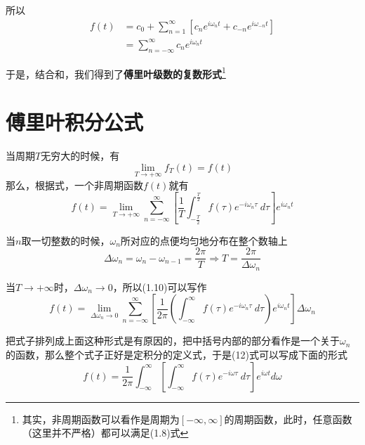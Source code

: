         所以
        \begin{equation}
            \begin{split}
                f(t)&= c_0+\sum\limits_{n=1}^\infty[c_n e^{i\omega_n t}+c_{-n}e^{i\omega_{-n} t}]\\
                &= \sum\limits_{n=-\infty}^{\infty}c_n e^{i\omega_n t}
            \end{split}
            \label{eq: 1.8}
        \end{equation}

        于是，结合和，我们得到了\textbf{傅里叶级数的复数形式}\footnote{其实，非周期函数可以看作是周期为$[-\infty, \infty]$的周期函数，此时，任意函数（这里并不严格）都可以满足(1.8)式}

    \section{傅里叶积分公式}
        当周期$T$无穷大的时候，有
        \begin{equation}
            \lim_{T\to +\infty}f_T(t)=f(t)
            \label{eq: 1.9}
        \end{equation}
        那么，根据式，一个非周期函数$f(t)$就有
        \begin{equation}
            f(t)=\lim_{T\to +\infty}\sum\limits_{n=-\infty}^{\infty}\left[\dfrac{1}{T}\int_{-\frac{T}{2}}^{\frac{T}{2}}f(\tau)e^{-i\omega_n \tau}\ d\tau\right] e^{i\omega_n t}
            \label{eq: 1.10}
        \end{equation}

        当$n$取一切整数的时候，$\omega_n$所对应的点便均匀地分布在整个数轴上
        \begin{equation}
            \Delta\omega_n=\omega_n-\omega_{n - 1}=\dfrac{2\pi}{T}\Rightarrow T=\dfrac{2\pi}{\Delta\omega_n}
            \label{eq: 1.11}
        \end{equation}
        
        当$T\to +\infty$时，$\Delta\omega_n\to 0$，所以(1.10)可以写作
        \begin{equation}
            f(t)=\lim_{\Delta\omega_n\to 0}\sum\limits_{n=-\infty}^{\infty}\left[\dfrac{1}{2\pi}\left(\int_{-\infty}^{\infty}f(\tau)e^{-i\omega_n \tau}\ d\tau\right)e^{i\omega_n t}\right] \Delta\omega_n
            \label{eq: 1.12}
        \end{equation}
        
        把式子排列成上面这种形式是有原因的，把中括号内部的部分看作是一个关于$\omega_n$的函数，那么整个式子正好是定积分的定义式，于是(12)式可以写成下面的形式
        \begin{equation}
            f(t)=\dfrac{1}{2\pi}\int_{-\infty}^{\infty}\left[\int_{-\infty}^{\infty}f(\tau)e^{-i\omega \tau}\ d\tau\right] e^{i\omega t} d\omega
            \label{eq: 1.13}
        \end{equation}
        
